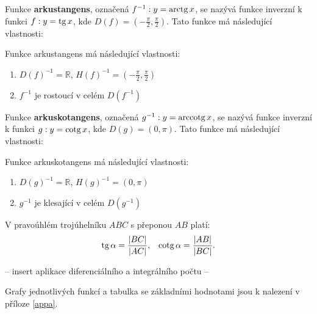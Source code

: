 \begin{definition}[Arkustangens]
  Funkce \textbf{arkustangens}, označená $f^{-1}: y=\operatorname{arctg} x$, se nazývá funkce inverzní k funkci $f: y=\operatorname{tg} x$, kde $D(f)=\left ( -\frac{\pi}{2}, \frac{\pi}{2} \right )$. Tato funkce má následující vlastnosti:
\end{definition}

\begin{pozn}
Funkce arkustangens má následující vlastnosti:
\begin{enumerate}
\item $D(f)^{-1} = \mathbb{R}$, $H(f)^{-1} = \left ( -\frac{\pi}{2}, \frac{\pi}{2} \right )$
\item $f^{-1}$ je rostoucí v celém $D(f^{-1})$
\end{enumerate}
\end{pozn}

\begin{definition}[Arkuskotangens]
  Funkce \textbf{arkuskotangens}, označená $g^{-1}: y=\operatorname{arccotg} x$, se nazývá funkce inverzní k funkci $g: y=\operatorname{cotg} x$, kde $D(g)=\left ( 0, \pi \right )$. Tato funkce má následující vlastnosti:
\end{definition}

\begin{pozn}
Funkce arkuskotangens má následující vlastnosti:
\begin{enumerate}
\item $D(g)^{-1} = \mathbb{R}$, $H(g)^{-1} = \left ( 0, \pi \right )$
\item $g^{-1}$ je klesající v celém $D(g^{-1})$
\end{enumerate}
\end{pozn}

\begin{veta}
    V pravoúhlém trojúhelníku $ABC$ s přeponou $AB$ platí:
    \begin{align*}
        \operatorname{tg} \alpha = \frac{ |BC| }{ |AC| }, & & \operatorname{cotg} \alpha = \frac{|AB|}{|BC|}.
    \end{align*}
\end{veta}

-- insert aplikace diferenciálního a integrálního počtu --

\begin{pozn}
    Grafy jednotlivých funkcí a tabulka se základními hodnotami jsou k nalezení
    v příloze \ref{appa}.
\end{pozn}

